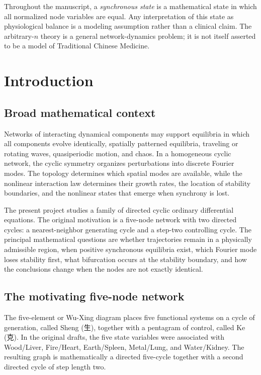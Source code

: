 \documentclass[11pt, reqno]{amsart}
\theoremstyle{definition}
\theoremstyle{remark}
\begin{document}
	Throughout the manuscript, a \emph{synchronous state} is a mathematical state
	in which all normalized node variables are equal.  Any interpretation of this
	state as physiological balance is a modeling assumption rather than a clinical
	claim.  The arbitrary-$n$ theory is a general network-dynamics problem; it is
	not itself asserted to be a model of Traditional Chinese Medicine.
	
	\section{Introduction}
	\label{sec:introduction}
	
	\subsection{Broad mathematical context}
	
	Networks of interacting dynamical components may support equilibria in which
	all components evolve identically, spatially patterned equilibria, traveling or
	rotating waves, quasiperiodic motion, and chaos.  In a homogeneous cyclic
	network, the cyclic symmetry organizes perturbations into discrete Fourier
	modes.  The topology determines which spatial modes are available, while the
	nonlinear interaction law determines their growth rates, the location of
	stability boundaries, and the nonlinear states that emerge when synchrony is
	lost.
	
	The present project studies a family of directed cyclic ordinary differential
	equations.  The original motivation is a five-node network with two directed
	cycles: a nearest-neighbor generating cycle and a step-two controlling cycle.
	The principal mathematical questions are whether trajectories remain in a
	physically admissible region, when positive synchronous equilibria exist, which
	Fourier mode loses stability first, what bifurcation occurs at the stability
	boundary, and how the conclusions change when the nodes are not exactly
	identical.
	
	\subsection{The motivating five-node network}
	
	The five-element or Wu-Xing diagram places five functional systems on a cycle
	of generation, called Sheng (生), together with a pentagram of control, called
	Ke (克).  In the original drafts, the five state variables were associated with
	Wood/Liver, Fire/Heart, Earth/Spleen, Metal/Lung, and Water/Kidney.  The
	resulting graph is mathematically a directed five-cycle together with a second
	directed cycle of step length two.
	
\end{document}
